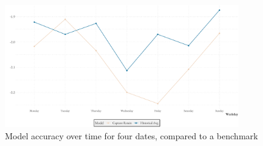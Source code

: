\begin{figure}
    \centering
    \includegraphics[width=0.9\textwidth]{../plots/SCRPS_over_weekdays}
    \caption{Model accuracy over time for four dates, compared to a benchmark}
    \label{fig:SCRPS_weekdays}
\end{figure}



% 
% 
% 


